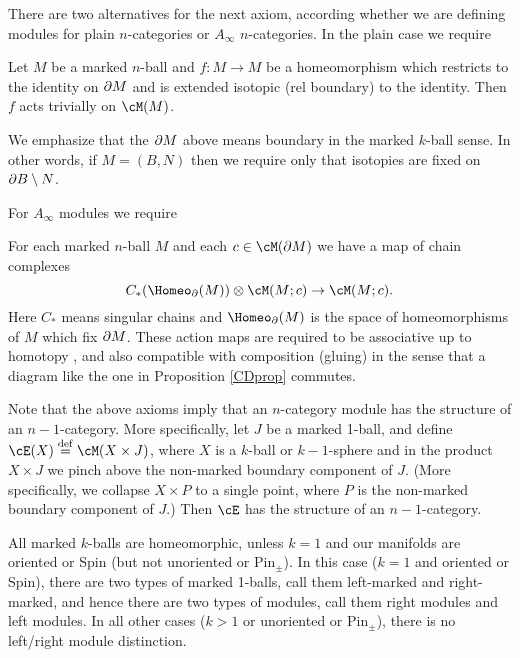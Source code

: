 

There are two alternatives for the next axiom, according whether we are defining
modules for plain $n$-categories or $A_\infty$ $n$-categories.
In the plain case we require

{Let $M$ be a marked $n$-ball and $f: M\to M$ be a homeomorphism which restricts
to the identity on $\partial M$ and is extended isotopic (rel boundary) to the identity.
Then $f$ acts trivially on $\cM(M)$.}


We emphasize that the $\partial M$ above means boundary in the marked $k$-ball sense.
In other words, if $M = (B, N)$ then we require only that isotopies are fixed 
on $\partial B \setminus N$.

For $A_\infty$ modules we require

{For each marked $n$-ball $M$ and each $c\in \cM(\bd M)$ we have a map of chain complexes
\[
	C_*(\Homeo_\bd(M))\ot \cM(M; c) \to \cM(M; c) .
\]
Here $C_*$ means singular chains and $\Homeo_\bd(M)$ is the space of homeomorphisms of $M$
which fix $\partial M$.
These action maps are required to be associative up to homotopy
, and also compatible with composition (gluing) in the sense that
a diagram like the one in Proposition \ref{CDprop} commutes.
}

\medskip

Note that the above axioms imply that an $n$-category module has the structure
of an $n{-}1$-category.
More specifically, let $J$ be a marked 1-ball, and define $\cE(X)\deq \cM(X\times J)$,
where $X$ is a $k$-ball or $k{-}1$-sphere and in the product $X\times J$ we pinch 
above the non-marked boundary component of $J$.
(More specifically, we collapse $X\times P$ to a single point, where
$P$ is the non-marked boundary component of $J$.)
Then $\cE$ has the structure of an $n{-}1$-category.

All marked $k$-balls are homeomorphic, unless $k = 1$ and our manifolds
are oriented or Spin (but not unoriented or $\text{Pin}_\pm$).
In this case ($k=1$ and oriented or Spin), there are two types
of marked 1-balls, call them left-marked and right-marked,
and hence there are two types of modules, call them right modules and left modules.
In all other cases ($k>1$ or unoriented or $\text{Pin}_\pm$),
there is no left/right module distinction.

